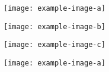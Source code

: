 \begin{subfigure}[c]{0.22\textwidth}
  \centering
  \texttt{[image: example-image-a]}
  \label{fig:subfig-a}
\end{subfigure}
\begin{subfigure}[c]{0.22\textwidth}
  \centering
  \texttt{[image: example-image-b]}
  \label{fig:subfig-b}
\end{subfigure}
\begin{subfigure}[c]{0.22\textwidth}
  \centering
  \texttt{[image: example-image-c]}
  \label{fig:subfig-c}
\end{subfigure}
\begin{subfigure}[c]{0.22\textwidth}
  \centering
  \texttt{[image: example-image-a]}
  \label{fig:subfig-d}
\end{subfigure}